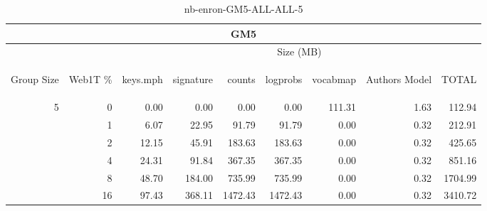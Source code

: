 \begin{center}
\begin{table}[htbp] 
 \begin{center}
\begin{tabular}{ | r | r | r | r | r | r | r | r | r |}
\hline
\multicolumn{9}{|c|}{GM5}\\
\hline
 & & \multicolumn{7}{|c|}{Size (MB)}\\ \cline{3-9}
\begin{sideways}Group Size\end{sideways} & \begin{sideways}Web1T \% \end{sideways} & \begin{sideways}keys.mph\end{sideways} & \begin{sideways}signature\end{sideways} & \begin{sideways}counts\end{sideways} & \begin{sideways}logprobs\end{sideways} & \begin{sideways}vocabmap\end{sideways} & \begin{sideways}Authors Model \end{sideways} & \begin{sideways}TOTAL\end{sideways}\\
\hline
\multirow{5}{*}{5}
 & 0 & 0.00 & 0.00 & 0.00 & 0.00 & 111.31 & 1.63 & 112.94\\ \cline{2-9}
 & 1 & 6.07 & 22.95 & 91.79 & 91.79 & 0.00 & 0.32 & 212.91\\ \cline{2-9}
 & 2 & 12.15 & 45.91 & 183.63 & 183.63 & 0.00 & 0.32 & 425.65\\ \cline{2-9}
 & 4 & 24.31 & 91.84 & 367.35 & 367.35 & 0.00 & 0.32 & 851.16\\ \cline{2-9}
 & 8 & 48.70 & 184.00 & 735.99 & 735.99 & 0.00 & 0.32 & 1704.99\\ \cline{2-9}
 & 16 & 97.43 & 368.11 & 1472.43 & 1472.43 & 0.00 & 0.32 & 3410.72\\ \cline{2-9}
\hline
\end{tabular}
\caption{nb-enron-GM5-ALL-ALL-5}
\label{table:nb-enron-GM5-ALL-ALL-5}
\end{center}
 \end{table}
\end{center}

